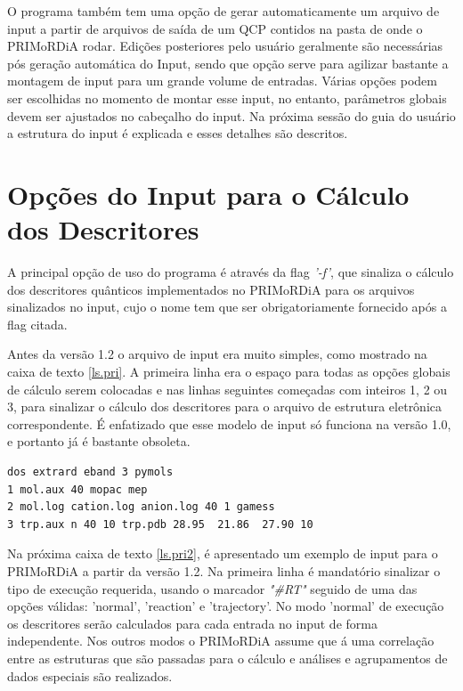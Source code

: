 \documentclass[a4paper,11pt]{refart}
\begin{document}
O programa também tem uma opção de gerar automaticamente um arquivo de input a partir de arquivos de saída de um QCP contidos na pasta de onde o PRIMoRDiA rodar. Edições posteriores pelo usuário geralmente são necessárias pós geração automática do Input, sendo que opção serve para agilizar bastante a montagem de input para um grande volume de entradas. Várias opções podem ser escolhidas no momento de montar esse input, no entanto, parâmetros globais devem ser ajustados no cabeçalho do input. Na próxima sessão do guia do usuário a estrutura do input é explicada e esses detalhes são descritos. 

\newpage
\section{Opções do Input para o Cálculo dos Descritores}

A principal opção de uso do programa é através da flag \emph{'-f'}, que sinaliza o cálculo dos descritores quânticos implementados no PRIMoRDiA para os arquivos sinalizados no input, cujo o nome tem que ser obrigatoriamente fornecido após a flag citada. 

Antes da versão 1.2 o arquivo de input era muito simples, como mostrado na caixa de texto \autoref{ls.pri}. A primeira linha era o espaço para todas as opções globais de cálculo serem colocadas e nas linhas seguintes começadas com inteiros 1, 2 ou 3, para sinalizar o cálculo dos descritores para o arquivo de estrutura eletrônica correspondente. É enfatizado que esse modelo de input só funciona na versão 1.0, e portanto já é bastante obsoleta.   

\hspace*{-\leftmarginwidth}
\begin{minipage}{\fullwidth}
\begin{lstlisting}[caption=Exemplo de input utilizado antes da versão 1.2.,label={ls.pri}]
dos extrard eband 3 pymols
1 mol.aux 40 mopac mep
2 mol.log cation.log anion.log 40 1 gamess 
3 trp.aux n 40 10 trp.pdb 28.95  21.86  27.90 10 
\end{lstlisting}
\end{minipage}

Na próxima caixa de texto \autoref{ls.pri2}, é apresentado um exemplo de input para o PRIMoRDiA a partir da versão 1.2. Na primeira linha é mandatório sinalizar o tipo de execução requerida, usando o marcador \emph{"\#RT"} seguido de uma das opções válidas: 'normal', 'reaction' e 'trajectory'. No modo 'normal' de execução os descritores serão calculados para cada entrada no input de forma independente. Nos outros modos o PRIMoRDiA assume que á uma correlação entre as estruturas que são passadas para o cálculo e análises e agrupamentos de dados especiais são realizados. 
\end{document}
